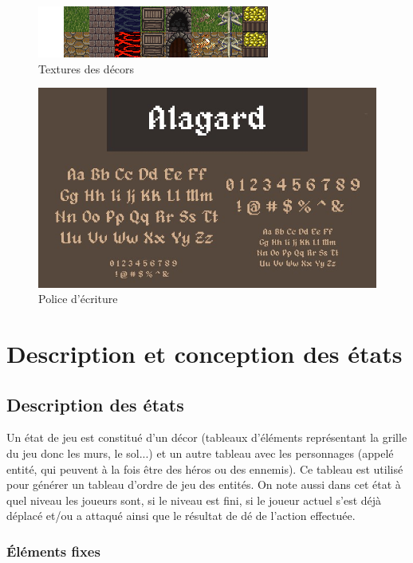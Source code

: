 \documentclass[a4paper,12pt]{article}
\begin{document}
\begin{figure}[hbt!]
    \centering
    \includegraphics[scale=2, angle=0]{images/terrain.png}
    \caption{Textures des décors}
    \label{fig:textDecor}
\end{figure}

\begin{figure}[hbt!]
    \centering
    \includegraphics[scale=0.5, angle=0]{images/fonts.jpg}
    \caption{Police d'écriture}
    \label{fig:fonts}
\end{figure}


\clearpage
\section{Description et conception des états}

\subsection{Description des états}
Un état de jeu est constitué d'un décor (tableaux d'éléments représentant la grille du jeu donc les murs, le sol...) et un autre tableau avec les personnages (appelé entité, qui peuvent à la fois être des héros ou des ennemis). Ce tableau est utilisé pour générer un tableau d'ordre de jeu des entités. On note aussi dans cet état à quel niveau les joueurs sont, si le niveau est fini, si le joueur actuel s'est déjà déplacé et/ou a attaqué ainsi que le résultat de dé de l'action effectuée.

\subsubsection{Éléments fixes}
\end{document}
